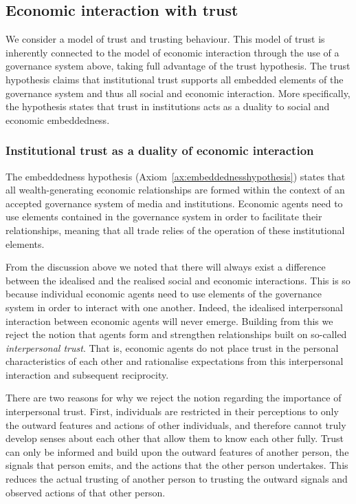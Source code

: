 \begin{subappendices}
\subsection{Economic interaction with trust}

We consider a model of trust and trusting behaviour. This model of trust is inherently connected to the model of economic interaction through the use of a governance system above, taking full advantage of the trust hypothesis. The trust hypothesis claims that institutional trust supports all embedded elements of the governance system and thus all social and economic interaction. More specifically, the hypothesis states that trust in institutions acts as a duality to social and economic embeddedness.

\subsubsection{Institutional trust as a duality of economic interaction}

The embeddedness hypothesis (Axiom~\ref{ax:embeddednesshypothesis}) states that all wealth-generating economic relationships are formed within the context of an accepted governance system of media and institutions. Economic agents need to use elements contained in the governance system in order to facilitate their relationships, meaning that all trade relies of the operation of these institutional elements.

From the discussion above we noted that there will always exist a difference between the idealised and the realised social and economic interactions. This is so because individual economic agents need to use elements of the governance system in order to interact with one another. Indeed, the idealised interpersonal interaction between economic agents will never emerge. Building from this we reject the notion that agents form and strengthen relationships built on so-called \emph{interpersonal trust}. That is, economic agents do not place trust in the personal characteristics of each other and rationalise expectations from this interpersonal interaction and subsequent reciprocity.

There are two reasons for why we reject the notion regarding the importance of interpersonal trust. First, individuals are restricted in their perceptions to only the outward features and actions of other individuals, and therefore cannot truly develop senses about each other that allow them to know each other fully. Trust can only be informed and build upon the outward features of another person, the signals that person emits, and the actions that the other person undertakes. This reduces the actual trusting of another person to trusting the outward signals and observed actions of that other person.


\end{subappendices}
